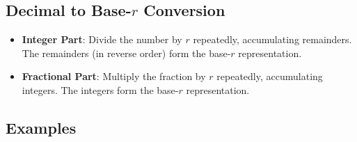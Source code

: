 \documentclass[a4paper,12pt]{article}
\begin{document}
	\subsection*{Decimal to Base-$r$ Conversion}
	\begin{itemize}
		\item \textbf{Integer Part}: Divide the number by $r$ repeatedly, accumulating remainders. The remainders (in reverse order) form the base-$r$ representation.
		\item \textbf{Fractional Part}: Multiply the fraction by $r$ repeatedly, accumulating integers. The integers form the base-$r$ representation.
	\end{itemize}
	
	\subsection*{Examples}
\end{document}

